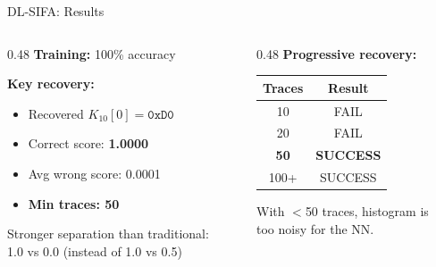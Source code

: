 \documentclass[aspectratio=169]{beamer}
\begin{document}
\begin{frame}{DL-SIFA: Results}
\begin{columns}[T]
\begin{column}{0.48\textwidth}
\textbf{Training:} 100\% accuracy

\vspace{0.3cm}
\textbf{Key recovery:}
\begin{itemize}
    \item Recovered $K_{10}[0] = \texttt{0xD0}$ \checkmark
    \item Correct score: \textbf{1.0000}
    \item Avg wrong score: 0.0001
    \item \textbf{Min traces: 50}
\end{itemize}

\vspace{0.3cm}
\small Stronger separation than traditional: \\
1.0 vs 0.0 (instead of 1.0 vs 0.5)
\end{column}
\begin{column}{0.48\textwidth}
\centering
\small \textbf{Progressive recovery:}
\vspace{0.1cm}

\begin{tabular}{cc}
\toprule
\textbf{Traces} & \textbf{Result} \\
\midrule
10 & FAIL \\
20 & FAIL \\
\textbf{50} & \textbf{SUCCESS} \\
100+ & SUCCESS \\
\bottomrule
\end{tabular}

\vspace{0.3cm}
\small With $<$50 traces, histogram is \\
too noisy for the NN.
\end{column}
\end{columns}
\end{frame}
\end{document}
